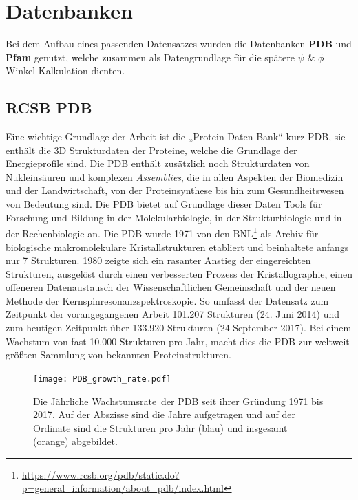 \newpage
\section{Datenbanken}
Bei dem Aufbau eines passenden Datensatzes wurden die Datenbanken \textbf{PDB} und \textbf{Pfam} genutzt, welche zusammen als Datengrundlage für die spätere $\psi$ \& $\phi$ Winkel Kalkulation dienten. 


\subsection{RCSB PDB}

Eine wichtige Grundlage der Arbeit ist die „Protein Daten Bank“ kurz PDB\cite{Bernstein.1977}, sie enthält die 3D Strukturdaten der Proteine, welche die Grundlage der Energieprofile sind. Die \ac{PDB} enthält zusätzlich noch Strukturdaten von Nukleinsäuren und komplexen \emph{Assemblies}, die in allen Aspekten der Biomedizin und der Landwirtschaft, von der Proteinsynthese bis hin zum Gesundheitswesen von Bedeutung sind. Die \ac{PDB} bietet auf Grundlage dieser Daten Tools für Forschung und Bildung in der Molekularbiologie, in der Strukturbiologie und in der Rechenbiologie an.
Die \ac{PDB} wurde 1971 von den \ac{BNL}\footnote{\url{https://www.rcsb.org/pdb/static.do?p=general_information/about_pdb/index.html}} als Archiv für biologische makromolekulare Kristallstrukturen etabliert und beinhaltete anfangs nur 7 Strukturen. 1980 zeigte sich ein rasanter Anstieg der eingereichten Strukturen, ausgelöst durch einen verbesserten Prozess der Kristallographie, einen offeneren Datenaustausch der Wissenschaftlichen Gemeinschaft und der neuen Methode der Kernspinresonanzspektroskopie. So umfasst der Datensatz zum Zeitpunkt der vorangegangenen Arbeit 101.207 Strukturen (24. Juni 2014) und zum heutigen Zeitpunkt über 133.920 Strukturen (24 September 2017). Bei einem Wachstum von fast 10.000 Strukturen pro Jahr, macht dies die \ac{PDB} zur weltweit größten Sammlung von bekannten Proteinstrukturen.

\begin{figure}
\texttt{[image: PDB\_growth\_rate.pdf]}
\caption{Die Jährliche Wachstumsrate\protect\footnotemark \ der \ac{PDB} seit ihrer Gründung 1971 bis 2017. Auf der Abszisse sind die Jahre aufgetragen und auf der Ordinate sind die Strukturen pro Jahr (blau) und insgesamt (orange) abgebildet.}
\label{fig:PDB_growth_rate}
\end{figure}


